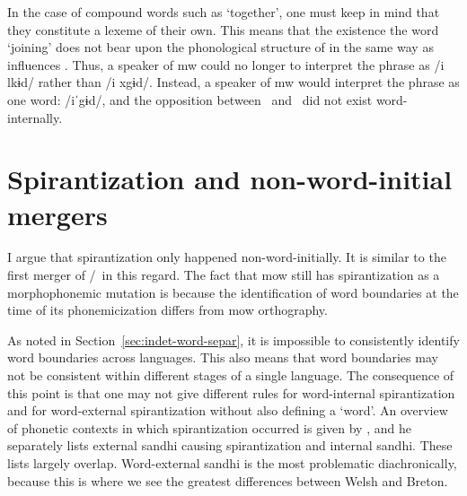 In the case of compound words such as  `together', one must keep in mind that they constitute a lexeme of their own. This means that the existence the word  `joining' does not bear upon the phonological structure of  in the same way as  influences . Thus, a speaker of \gls{mw} could no longer to interpret the phrase  as /i \gls{l}kɨd/ rather than /i \gls{x}gɨd/. Instead, a speaker of \gls{mw} would interpret the phrase as one word: /iˈgɨd/, and the opposition between \lT\ and \xD\ did not exist word-internally.





\section{Spirantization and non-word-initial mergers}
\label{sec:spirantization}

I argue that spirantization only happened non-word-initially.
It is similar to the first merger of \lT/\xD\ in this regard.
The fact that \gls{mow} still has spirantization as a morphophonemic mutation is because the identification of word boundaries at the time of its phonemicization differs from \gls{mow} orthography.

As noted in Section~\ref{sec:indet-word-separ}, it is impossible to consistently identify word boundaries across languages.
This also means that word boundaries may not be consistent within different stages of a single language.
The consequence of this point is that one may not give different rules for word-internal spirantization and for word-external spirantization without also defining a `word'.
An overview of phonetic contexts in which spirantization occurred is given by \autocite[2--3]{schrijver_spirantization_1999}, and he separately lists external sandhi causing spirantization and internal sandhi.
These lists largely overlap.
Word-external sandhi is the most problematic diachronically, because this is where we see the greatest differences between Welsh and Breton.

